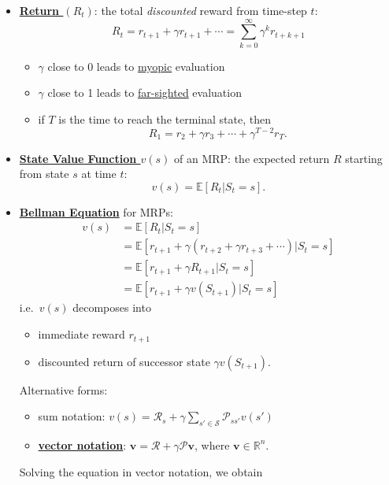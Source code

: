 \documentclass[twocolumn,landscape,10pt]{article}
\theoremstyle{definition}
\begin{document}
\begin{itemize}
    \item \textbf{\underline{Return $(R_t)$}}: the total \emph{discounted} 
        reward from time-step $t$:
        \[
            R_t=r_{t+1}+\gamma r_{t+1}+\cdots=\sum_{k=0}^{\infty} \gamma^k r_{t+k+1}
        \]
        \begin{itemize}
            \item $\gamma$ close to 0 leads to \underline{myopic} evaluation
            \item $\gamma$ close to 1 leads to \underline{far-sighted}
                evaluation
            \item if $T$ is the time to reach the terminal state, then
                \[
                    R_1=r_2+\gamma r_3+\cdots+\gamma^{T-2}r_T.
                \]
        \end{itemize}
    \item \textbf{\underline{State Value Function $v(s)$}} of an MRP: the
        expected return $R$ starting from state $s$ at time $t$:
        \[
            v(s)=\mathbb{E}[R_t|S_t=s].
        \]
    \item \textbf{\underline{Bellman Equation}} for MRPs:
        \begin{align*}
            v(s)
            &= \mathbb{E}[R_t|S_t=s] \\
            &= \mathbb{E}[r_{t+1}+\gamma(r_{t+2}+\gamma r_{t+3}+\cdots)|S_t=s] \\
            &= \mathbb{E}[r_{t+1}+\gamma R_{t+1}|S_t=s] \\
            &= \mathbb{E}[r_{t+1}+\gamma v(S_{t+1})|S_t=s]
        \end{align*}
        i.e.\ $v(s)$ decomposes into
        \begin{itemize}
            \item immediate reward $r_{t+1}$
            \item discounted return of successor state $\gamma v(S_{t+1})$.
        \end{itemize}
        Alternative forms:
        \begin{itemize}
            \item sum notation:
                $v(s)=\mathcal{R}_s+\gamma\sum_{s'\in\mathcal{S}}\mathcal{P}_{ss'}v(s')$
            \item \textbf{\underline{vector notation}}:
                $\mathbf{v}=\mathcal{R}+\gamma\mathcal{P}\mathbf{v}$, where
                $\mathbf{v}\in\mathbb{R}^{n}$.
        \end{itemize}
        Solving the equation in vector notation, we obtain

\end{itemize}
\end{document}

